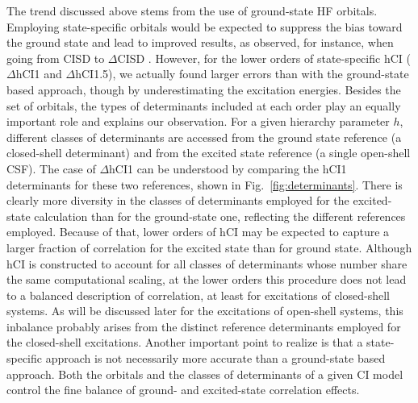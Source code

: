 \documentclass[aip,jcp,reprint,noshowkeys,superscriptaddress]{revtex4-1}
\begin{document}
The trend discussed above stems from the use of ground-state HF orbitals.
Employing state-specific orbitals would be expected to suppress the bias toward the ground state and lead to improved results, as observed, for instance, when going from CISD to $\Delta$CISD \cite{Kossoski_2023}.
However, for the lower orders of state-specific hCI ($\Delta$hCI1 and $\Delta$hCI1.5), we actually found larger errors than with the ground-state based approach, though by underestimating the excitation energies.
Besides the set of orbitals, the types of determinants included at each order play an equally important role and explains our observation.
For a given hierarchy parameter $h$, different classes of determinants are accessed from the ground state reference (a closed-shell determinant) and from the excited state reference (a single open-shell CSF).
The case of $\Delta$hCI1 can be understood by comparing the hCI1 determinants for these two references, shown in Fig.~\ref{fig:determinants}.
There is clearly more diversity in the classes of determinants employed for the excited-state calculation than for the ground-state one, reflecting the different references employed.
Because of that, lower orders of hCI may be expected to capture a larger fraction of correlation for the excited state than for ground state.
Although hCI is constructed to account for all classes of determinants whose number share the same computational scaling,
at the lower orders this procedure does not lead to a balanced description of correlation, at least for excitations of closed-shell systems.
As will be discussed later for the excitations of open-shell systems, this inbalance probably arises from the distinct reference determinants employed for the closed-shell excitations.
%
Another important point to realize is that a state-specific approach is not necessarily more accurate than a ground-state based approach.
Both the orbitals and the classes of determinants of a given CI model control the fine balance of ground- and excited-state correlation effects.

\end{document}
